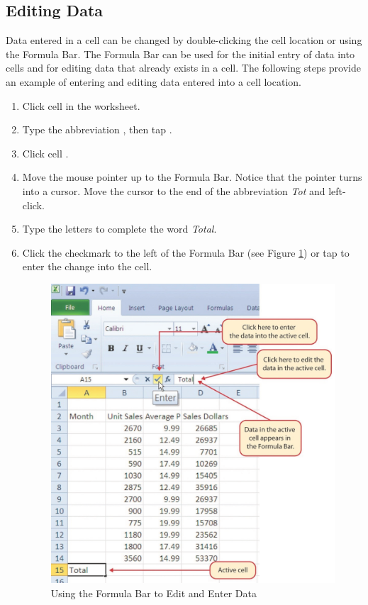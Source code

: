 \subsection{Editing Data}

Data entered in a cell can be changed by double-clicking the cell location or using the Formula Bar. The Formula Bar can be used for the initial entry of data into cells and for editing data that already exists in a cell. The following steps provide an example of entering and editing data entered into a cell location.

\begin{enumbox}
	\begin{enumerate}
		\item Click cell  in the  worksheet.
		\item Type the abbreviation , then tap .
		\item Click cell .
		\item Move the mouse pointer up to the Formula Bar. Notice that the pointer turns into a cursor. Move the cursor to the end of the abbreviation \textit{Tot} and left-click.
		\item Type the letters  to complete the word \textit{Total}.
		\item Click the checkmark to the left of the Formula Bar (see Figure \ref{01:fig17}) or tap  to enter the change into the cell.
	
		\begin{figure}[H]
			\centering
			\includegraphics[width=\maxwidth{.95\linewidth}]{gfx/ch01_fig17}
			\caption{Using the Formula Bar to Edit and Enter Data}
			\label{01:fig17}
		\end{figure}


\end{enumerate}
\end{enumbox}
